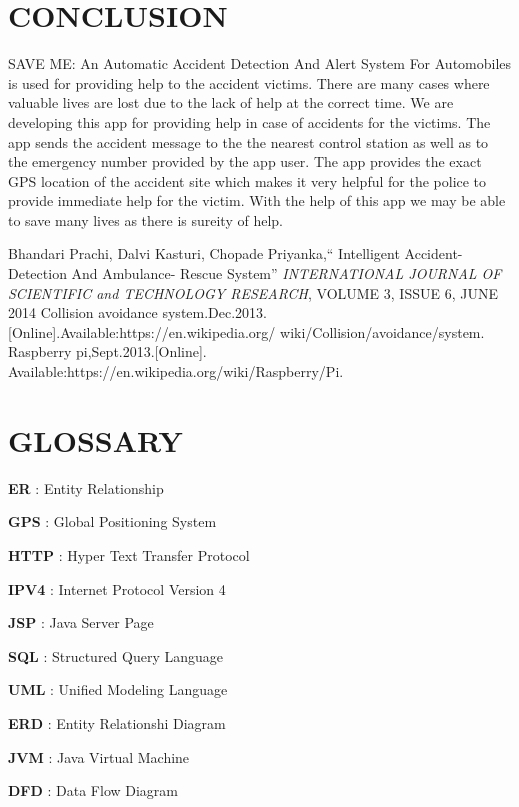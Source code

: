 \documentclass[12pt,a4paper,oneside]{report}
\newcommand{\quotes}[1]{``#1''}
\begin{document}
{\chapter{CONCLUSION}
\par SAVE ME: An Automatic Accident Detection And
Alert System For Automobiles is used for providing help to the accident victims. There are many cases where valuable lives are lost due to the lack of help at the correct time. We are developing this app for providing help in case of accidents for the victims. The app sends the accident message to the the nearest control station as well as to the emergency number provided by the app user. The app provides the exact GPS location of the accident site which makes it very helpful for the police to provide immediate help for the victim. With the help of this app we may be able to save many lives as there is sureity of help.
\renewcommand{\bibname}{\uppercase{REFERENCES}}
\begin{thebibliography}{999}


 Bhandari Prachi, Dalvi Kasturi, Chopade Priyanka,\quotes{ Intelligent Accident-Detection And Ambulance- Rescue System} \textit{INTERNATIONAL JOURNAL OF SCIENTIFIC and TECHNOLOGY RESEARCH}, VOLUME 3, ISSUE 6, JUNE 2014
 Collision avoidance system.Dec.2013.[Online].Available:https://en.wikipedia.org/ wiki/Collision/avoidance/system.
 Raspberry pi,Sept.2013.[Online]. Available:https://en.wikipedia.org/wiki/Raspberry/Pi.




\end{thebibliography}
\chapter*{GLOSSARY}
\textbf{ER}  : Entity Relationship
\par \textbf{GPS} : Global Positioning System
 \par \textbf{HTTP} : Hyper Text Transfer Protocol
\par \textbf{IPV4} : Internet Protocol Version 4
\par  \textbf{JSP} : Java Server Page
\par \textbf{SQL} : Structured Query Language
\par \textbf{UML} : Unified Modeling Language
\par \textbf{ERD} : Entity Relationshi Diagram
\par \textbf{JVM} : Java Virtual Machine
\par \textbf{DFD} : Data Flow Diagram

}
\end{document}
